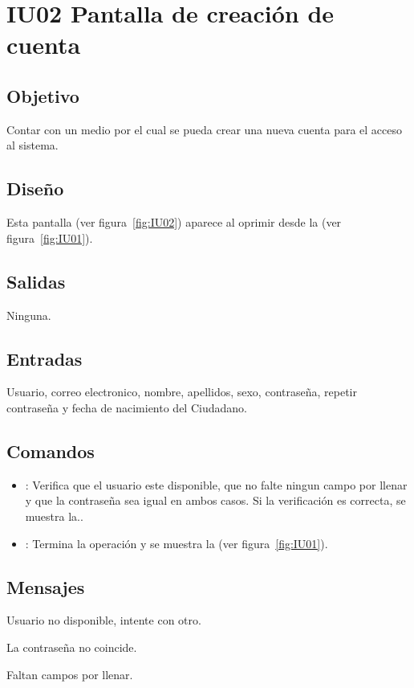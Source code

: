 \section{IU02 Pantalla de creación de cuenta}

\subsection{Objetivo}
	Contar con un medio por el cual se pueda crear una nueva cuenta para el acceso al sistema.

\subsection{Diseño}
	Esta pantalla  (ver figura~\ref{fig:IU02}) aparece al oprimir  desde la  (ver figura~\ref{fig:IU01}). 
	

\subsection{Salidas}

	Ninguna.

\subsection{Entradas}
Usuario, correo electronico, nombre, apellidos, sexo, contraseña, repetir contraseña y fecha de nacimiento del Ciudadano.

\subsection{Comandos}
\begin{itemize}
	\item {}: Verifica que el usuario este disponible, que no falte ningun campo por llenar y que la contraseña sea igual en ambos casos. Si la verificación es correcta, se muestra la.. 
	\item {}: Termina la operación y se muestra la  (ver figura~\ref{fig:IU01}). 
\end{itemize}

\subsection{Mensajes}

\begin{Citemize}
	\item Usuario no disponible, intente con otro.
	\item La contraseña no coincide.
	\item Faltan campos por llenar.
\end{Citemize}




\clearpage